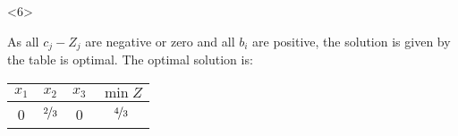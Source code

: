 \begin{frameExample}{}{}
\begin{description}
  \end{description}

\begin{onlyenv}<6>

{%
  \centering
      \par
    }

 As \alert{all $c_j - Z_j$ are negative or zero and all $b_i$ are positive}, the solution is given by the table is optimal. The optimal solution is:

 
 {\centering
   \begin{tabular}{cccc}
     $x_1$&$x_2$&$x_3$& $\min Z$\\
     \midrule
     0&$\nicefrac{2}{3}$&0& $\cellcolor{yellow}\nicefrac{4}{3}$
   \end{tabular}
 \par}
      
  \end{onlyenv}  
\end{frameExample}



